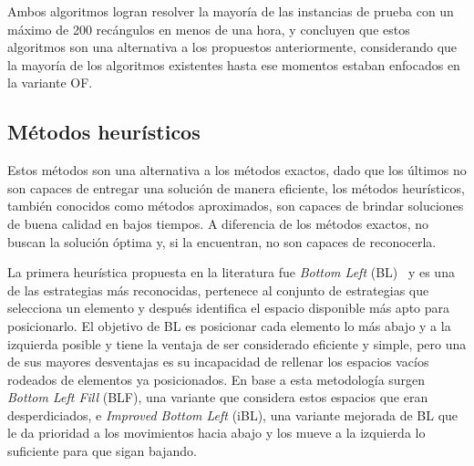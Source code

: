 \documentclass[letter, 10pt]{article}
\begin{document}
Ambos algoritmos logran resolver la mayor\'ia de las instancias de prueba con un m\'aximo de 200 rec\'angulos en menos de una hora, y concluyen que estos algoritmos son una alternativa a los propuestos anteriormente, considerando que la mayor\'ia de los algoritmos existentes hasta ese momentos estaban enfocados en la variante OF.

\subsection{M\'etodos heur\'isticos}

Estos m\'etodos son una alternativa a los m\'etodos exactos, dado que los \'ultimos no son capaces de entregar una soluci\'on de manera eficiente, los m\'etodos heur\'isticos, tambi\'en conocidos como m\'etodos aproximados, son capaces de brindar soluciones de buena calidad en bajos tiempos. A diferencia de los m\'etodos exactos, no buscan la soluci\'on \'optima y, si la encuentran, no son capaces de reconocerla.

La primera heur\'istica propuesta en la literatura fue \emph{Bottom Left} (BL)~\cite{oliveira2016survey} y es una de las estrategias m\'as reconocidas, pertenece al conjunto de estrategias que selecciona un elemento y despu\'es identifica el espacio disponible m\'as apto para posicionarlo. El objetivo de BL es posicionar cada elemento lo m\'as abajo y a la izquierda posible y tiene la ventaja de ser considerado eficiente y simple, pero una de sus mayores desventajas es su incapacidad de rellenar los espacios vac\'ios rodeados de elementos ya posicionados. En base a esta metodolog\'ia surgen \emph{Bottom Left Fill} (BLF), una variante que considera estos espacios que eran desperdiciados, e \emph{Improved Bottom Left} (iBL), una variante mejorada de BL que le da prioridad a los movimientos hacia abajo y los mueve a la izquierda lo suficiente para que sigan bajando. 
\end{document}
